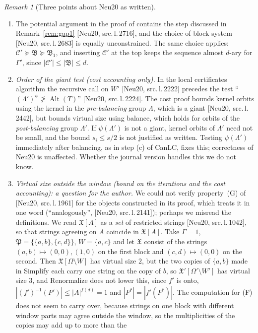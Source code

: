 \documentclass[11pt]{article}
\theoremstyle{plain}
\theoremstyle{definition}
\theoremstyle{remark}
\newtheorem{remark}[theorem]{Remark}
\theoremstyle{named}
\theoremstyle{namedrm}
\newcommand{\Alt}{\operatorname{Alt}}
\newcommand{\fB}{\mathfrak{B}}
\newcommand{\fX}{\mathfrak{X}}
\newcommand{\fP}{\mathfrak{P}}
\newcommand{\Cp}{\mathcal{C}'}
\newcommand{\src}[2]{[#1, src.\,l.\,#2]}
\begin{document}
\begin{remark}[Three points about Neu20 as written]\label{rem:neu20}
\begin{enumerate}
\item The potential argument in the proof of \cite[Lemma~4.36]{Neu20} contains the step discussed in
  Remark~\ref{rem:gap1} \src{Neu20}{2716}, and the choice of block system \src{Neu20}{2683} is equally
  unconstrained. The same choice applies: $\Cp\succeq\fB\succeq\fB_1$, and inserting $\Cp$ at the top keeps the
  sequence almost $d$-ary for $\Gamma'$, since $|\Cp|\le|\fB|\le d$.
\item \emph{Order of the giant test (cost accounting only).} In the local certificates algorithm the
  recursive call on $W'$ \src{Neu20}{2222} precedes the test ``$(\Lambda')^\psi\not\ge\Alt(T)$''
  \src{Neu20}{2224}. The cost proof bounds kernel orbits using the kernel in the \emph{pre-balancing} group
  $\Lambda$, which is a giant \src{Neu20}{2442}, but bounds virtual size using balance, which holds for orbits of
  the \emph{post-balancing} group $\Lambda'$. If $\psi(\Lambda')$ is not a giant, kernel orbits of $\Lambda'$ need not be
  small, and the bound $s_i\le s/2$ is not justified as written. Testing $\psi(\Lambda')$ immediately after
  balancing, as in step (c) of CanLC, fixes this; correctness of Neu20 is unaffected. Whether the journal
  version handles this we do not know.
\item \emph{Virtual size outside the window (bound on the iterations and the cost accounting): a question for the author.} We could not verify property~(G) of \cite[Thm.~4.17]{Neu20}
  \src{Neu20}{1961} for the objects constructed in its proof, which treats it in one word (``analogously'', \src{Neu20}{2141}); perhaps we misread the definitions. We read $\fX[A]$ as a \emph{set} of restricted strings \src{Neu20}{1042}, so that strings agreeing on $A$ coincide in $\fX[A]$. Take $\Gamma=1$, $\fP=\{\{a,b\},\{c,d\}\}$, $W=\{a,c\}$ and let $\fX$ consist of the strings
  $(a,b)\mapsto(0,0),(1,0)$ on the first block and $(c,d)\mapsto(0,0)$ on the second. Then $\fX[\Omega\setminus W]$ has virtual size $2$, but the two
  copies of $\{a,b\}$ made in Simplify each carry one string on the copy of $b$, so $\fX'[\Omega'\setminus W']$ has virtual size $3$, and Renormalize does not lower
  this, since $f'$ is onto, $|(f')^{-1}(P')|\le|A|^{f(d)}=1$ and $|P^*|=|f'(P^*)|$. The computation for (F) does not seem to carry over, because
  strings on one block with different window parts may agree outside the window, so the multiplicities of the copies may add up to more than the

\end{enumerate}
\end{remark}
\end{document}
